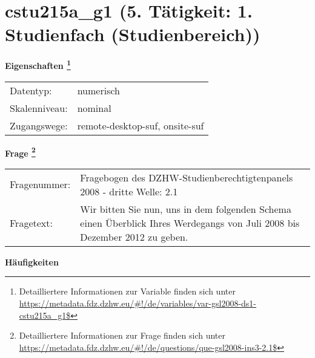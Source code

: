 
    \setcounter{footnote}{0}

    \vspace*{-1.8cm}
	\section{cstu215a\_g1 (5. Tätigkeit: 1. Studienfach (Studienbereich))}
	\label{section:cstu215a_g1}



    \vspace*{0.5cm}
    \noindent\textbf{Eigenschaften
	\footnote{Detailliertere Informationen zur Variable finden sich unter
		\url{https://metadata.fdz.dzhw.eu/\#!/de/variables/var-gsl2008-ds1-cstu215a_g1$}}}\\
	\begin{tabularx}{\hsize}{@{}lX}
	Datentyp: & numerisch \\
	Skalenniveau: & nominal \\
	Zugangswege: &
	  remote-desktop-suf, 
	  onsite-suf
 \\
    \end{tabularx}



				\vspace*{0.5cm}
                \noindent\textbf{Frage
	                \footnote{Detailliertere Informationen zur Frage finden sich unter
		              \url{https://metadata.fdz.dzhw.eu/\#!/de/questions/que-gsl2008-ins3-2.1$}}}\\
				\begin{tabularx}{\hsize}{@{}lX}
					Fragenummer: &
					  Fragebogen des DZHW-Studienberechtigtenpanels 2008 - dritte Welle:
					  2.1
 \\
					Fragetext: & Wir bitten Sie nun, uns in dem folgenden Schema einen Überblick Ihres Werdegangs von Juli 2008 bis Dezember 2012 zu geben. \\
				\end{tabularx}





        		\vspace*{0.5cm}
                \noindent\textbf{Häufigkeiten}


